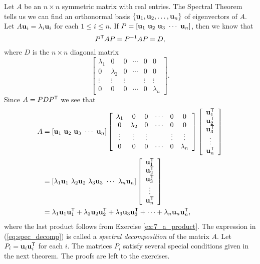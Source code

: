 
Let $A$ be an $n \times n$ symmetric matrix with real entries. The Spectral Theorem tells us we can find an orthonormal basis $\{\mathbf{u}_1, \mathbf{u}_2, \ldots, \mathbf{u}_n\}$ of eigenvectors of $A$. Let $A \mathbf{u}_i = \lambda_i \mathbf{u}_i$ for each $1 \leq i \leq n$. If $P = [ \vu_1 \  \vu_2 \  \vu_3 \  \cdots \ \vu_n]$, then we know that
\[P^{\mathsf{T}}AP = P^{-1}AP = D,\]
where $D$ is the $n \times n$ diagonal matrix
\[\left[ \begin{array}{cccccc} \lambda_1&0&0&\cdots&0&0 \\ 0&\lambda_2&0&\cdots&0&0 \\ \vdots&\vdots&\vdots&&\vdots&\vdots \\ 0&0&0&\cdots&0&\lambda_n \end{array} \right].\]
Since $A = PDP^{\mathsf{T}}$ we see that
\begin{align}
A &= [ \vu_1 \ \vu_2 \ \vu_3 \ \cdots \ \vu_n] \left[ \begin{array}{cccccc} \lambda_1&0&0&\cdots&0&0 \\ 0&\lambda_2&0&\cdots&0&0 \\ \vdots&\vdots&\vdots&&\vdots&\vdots \\ 0&0&0&\cdots&0&\lambda_n \end{array} \right] \left[ \begin{array}{c} \vu_1^{\tr} \\ \vu_2^{\tr} \\ \vu_3^{\tr} \\ \vdots \\ \vu_n^{\tr} \end{array} \right] \notag \\
	&= [ \lambda_1\vu_1 \ \lambda_2\vu_2 \ \lambda_3\vu_3 \ \cdots \ \lambda_n\vu_n] \left[ \begin{array}{c} \vu_1^{\tr} \\ \vu_2^{\tr} \\ \vu_3^{\tr} \\ \vdots \\ \vu_n^{\tr} \end{array} \right] \notag \\
	&= \lambda_1 \vu_1\vu_1^{\tr} + \lambda_2 \vu_2\vu_2^{\tr} + \lambda_3 \vu_3\vu_3^{\tr} + \cdots + \lambda_n \vu_n\vu_n^{\tr}, \label{eq:spec_decomp}
\end{align}
where the last product follows from Exercise \ref{ex:7_a_product}. The expression in (\ref{eq:spec_decomp}) is called a \emph{spectral decomposition} of the matrix $A$. Let $P_i = \mathbf{u}_i\mathbf{u}_i^{\mathsf{T}}$ for each $i$. The matrices $P_i$ satisfy several special conditions given in the next theorem. The proofs are left to the exercises. 


